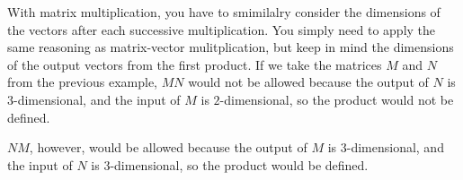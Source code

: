 \documentclass{ximera}
\begin{document}
\begin{example}
\begin{solution}

        \end{solution}

        With matrix multiplication, you have to smimilalry consider the dimensions of the vectors after each successive multiplication. You simply need to apply the same reasoning as matrix-vector mulitplication, but keep in mind the dimensions of the output vectors from the first product. If we take the matrices $M$ and $N$ from the previous example, $MN$ would not be allowed because the output of $N$ is $3$-dimensional, and the input of $M$ is $2$-dimensional, so the product would not be defined. 

        $NM$, however, would be allowed because the output of $M$ is $3$-dimensional, and the input of $N$ is $3$-dimensional, so the product would be defined.

\end{example}
\end{document}
